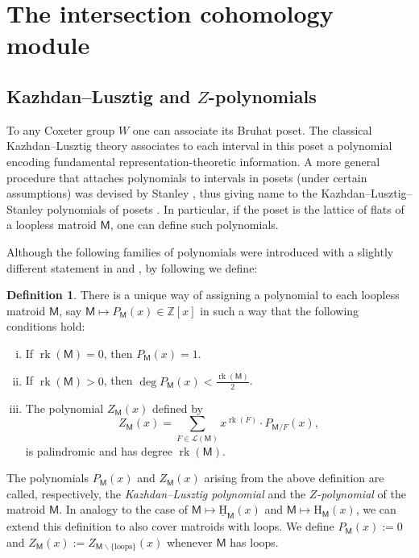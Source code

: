 \documentclass[11pt, a4paper, english]{amsart}
\theoremstyle{teoremas}
\theoremstyle{definition}
\newtheorem{definition}[theorem]{Definition}
\DeclareMathOperator{\rk}{rk}
\newcommand{\M}{\mathsf{M}}
\renewcommand{\H}{\mathrm{H}}
\newcommand{\uH}{\underline{\mathrm{H}}}
\begin{document}

\section{The intersection cohomology module}\label{sec:four}

\subsection{Kazhdan--Lusztig and \texorpdfstring{$Z$}{Z}-polynomials}

To any Coxeter group $W$ one can associate its Bruhat poset. The classical Kazhdan--Lusztig theory \cite{kazhdan-lusztig} associates to each interval in this poset a polynomial encoding fundamental representation-theoretic information. A more general procedure that attaches polynomials to intervals in posets (under certain assumptions) was devised by Stanley \cite{stanley-local}, thus giving name to the Kazhdan--Lusztig--Stanley polynomials of posets \cite{proudfoot-kls}. In particular, if the poset is the lattice of flats of a loopless matroid $\M$, one can define such polynomials.

Although the following families of polynomials were introduced with a slightly different statement in \cite{elias-proudfoot-wakefield} and \cite{proudfoot-xu-young}, by following \cite[Theorem~2.2]{braden-vysogorets} we define:

\begin{definition}
    There is a unique way of assigning a polynomial to each loopless matroid $\M$, say $\M \mapsto P_{\M}(x)\in \mathbb{Z}[x]$ in such a way that the following conditions hold:
    \begin{enumerate}[(i)]
        \item If $\rk(\M) = 0$, then $P_{\M}(x) = 1$.
        \item If $\rk(\M) > 0$, then $\deg P_{\M}(x) < \frac{\rk(\M)}{2}$.
        \item The polynomial $Z_{\M}(x)$ defined by
            \[ Z_{\M}(x) = \sum_{F\in\mathcal{L}(\M)} x^{\rk(F)}\cdot P_{\M/F}(x),\]
        is palindromic and has degree $\rk(\M)$.
    \end{enumerate}
\end{definition}


The polynomials $P_{\M}(x)$ and $Z_{\M}(x)$ arising from the above definition are called, respectively, the \textit{Kazhdan--Lusztig polynomial} and the \textit{$Z$-polynomial} of the matroid $\M$. In analogy to the case of $\M\mapsto \uH_{\M}(x)$ and $\M\mapsto \H_{\M}(x)$, we can extend this definition to also cover matroids with loops. We define $P_{\M}(x):=0$ and $Z_{\M}(x):= Z_{\M\smallsetminus\{\text{loops}\}}(x)$ whenever $\M$ has loops.
\end{document}
